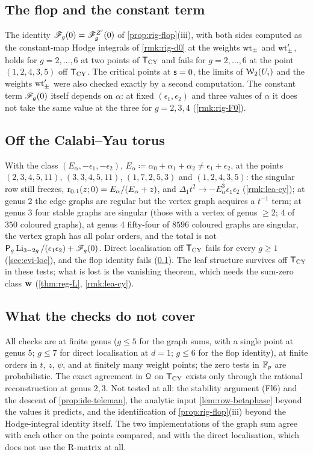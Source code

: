 \subsection{The flop and the constant term}
\label{sec:evi-flop}

The identity $\mathscr{F}_g(0)=\mathscr{F}^{Z'}_g(0)$ of \cref{prop:rig-flop}(iii), with both sides computed as the constant-map Hodge integrals of \cref{rmk:rig-d0} at the weights $\mathrm{wt}_\pm$ and $\mathrm{wt}'_\pm$, holds for $g=2,\dots,6$ at two points of $\mathsf{T}_{\mathrm{CY}}$ and fails for $g=2,\dots,6$ at the point $(1,2,4,3,5)$ off $\mathsf{T}_{\mathrm{CY}}$. The critical points at $\mathsf{s}=0$, the limits of $\mathcal{W}_2(U_i)$ and the weights $\mathrm{wt}'_\pm$ were also checked exactly by a second computation. The constant term $\mathscr{F}_g(0)$ itself depends on $\alpha$: at fixed $(\epsilon_1,\epsilon_2)$ and three values of $\alpha$ it does not take the same value at the three for $g=2,3,4$ (\cref{rmk:rig-F0}).

\subsection{Off the Calabi--Yau torus}
\label{sec:evi-offCY}

With the class $(E_\alpha,-\epsilon_1,-\epsilon_2)$, $E_\alpha\coloneqq\alpha_0+\alpha_1+\alpha_2\neq\epsilon_1+\epsilon_2$, at the points $(2,3,4,5,11)$, $(3,3,4,5,11)$, $(1,7,2,5,3)$ and $(1,2,4,3,5)$: the singular row still freezes, $\mathrm{r}_{0,1}(z;0)=E_\alpha/(E_\alpha+z)$, and $\Delta_1t^2\to-E_\alpha^3\epsilon_1\epsilon_2$ (\cref{rmk:lea-cy}); at genus 2 the edge graphs are regular but the vertex graph acquires a $t^{-1}$ term; at genus 3 four stable graphs are singular (those with a vertex of genus $\geq 2$; $4$ of $350$ coloured graphs), at genus 4 fifty-four of $8596$ coloured graphs are singular, the vertex graph has all polar orders, and the total is not $\mathsf{P}_{g}\operatorname{Li}_{3-2g}/(\epsilon_1\epsilon_2)+\mathscr{F}_g(0)$. Direct localisation off $\mathsf{T}_{\mathrm{CY}}$ fails for every $g\geq 1$ (\cref{sec:evi-loc}), and the flop identity fails (\cref{sec:evi-flop}). The leaf structure survives off $\mathsf{T}_{\mathrm{CY}}$ in these tests; what is lost is the vanishing theorem, which needs the sum-zero class $\mathbf{w}$ (\cref{thm:reg-L}, \cref{rmk:lea-cy}).

\subsection{What the checks do not cover}
\label{sec:evi-limits}

All checks are at finite genus ($g\leq 5$ for the graph sums, with a single point at genus 5; $g\leq 7$ for direct localisation at $d=1$; $g\leq 6$ for the flop identity), at finite orders in $t$, $z$, $\psi$, and at finitely many weight points; the zero tests in $\mathbb{F}_p$ are probabilistic. The exact agreement in $\mathcal{Q}$ on $\mathsf{T}_{\mathrm{CY}}$ exists only through the rational reconstruction at genus $2,3$. Not tested at all: the stability argument (Fl6) and the descent of \cref{prop:ide-teleman}, the analytic input \cref{lem:row-betaphase} beyond the values it predicts, and the identification of \cref{prop:rig-flop}(iii) beyond the Hodge-integral identity itself. The two implementations of the graph sum agree with each other on the points compared, and with the direct localisation, which does not use the R-matrix at all.
